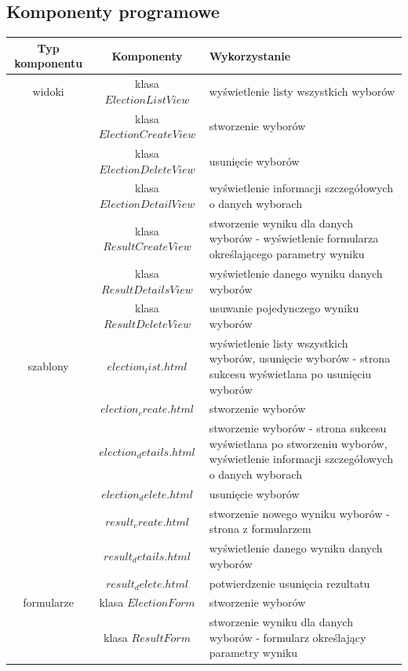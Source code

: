\documentclass[pdflatex,11pt]{../aghdoc_version2}
\begin{document}
\subsection{Komponenty programowe}
\begin{tabular}{|c|c|p{5cm}|}
\hline 
\textbf{Typ komponentu} & \textbf{Komponenty} & \textbf{Wykorzystanie} \\ 
\hline 
widoki & klasa $ElectionListView$ & wyświetlenie listy wszystkich wyborów \\ 
\cline{2-3} 
 & klasa $ElectionCreateView$ & stworzenie wyborów \\ 
\cline{2-3} 
 & klasa $ElectionDeleteView$ & usunięcie wyborów \\ 
\cline{2-3} 
 & klasa $ElectionDetailView$ & wyświetlenie informacji szczegółowych o
danych wyborach \\ 
\cline{2-3} 
 & klasa $ResultCreateView$ & stworzenie wyniku dla danych wyborów -
wyświetlenie formularza określającego
parametry wyniku \\ 
\cline{2-3} 
 & klasa $ResultDetailsView$ & wyświetlenie danego wyniku danych
wyborów \\ 
\cline{2-3} 
 & klasa $ResultDeleteView$ & usuwanie pojedynczego wyniku wyborów \\ 
\hline 
szablony & $election_list.html$ & wyświetlenie listy wszystkich wyborów,
usunięcie wyborów - strona sukcesu
wyświetlana po usunięciu wyborów \\ 
\cline{2-3} 
 & $election_create.html$ & stworzenie wyborów \\ 
\cline{2-3} 
 & $election_details.html$ & stworzenie wyborów - strona sukcesu
wyświetlana po stworzeniu wyborów,
wyświetlenie informacji szczegółowych o
danych wyborach \\ 
\cline{2-3} 
 & $election_delete.html$ & usunięcie wyborów \\ 
\cline{2-3} 
 & $result_create.html$ & stworzenie nowego wyniku wyborów -
strona z formularzem \\ 
\cline{2-3} 
 & $result_details.html$ & wyświetlenie danego wyniku danych
wyborów \\ 
\cline{2-3} 
 & $result_delete.html$ & potwierdzenie usunięcia rezultatu \\ 
\hline 
formularze & klasa $ElectionForm$ & stworzenie wyborów \\ 
\cline{2-3}
 & klasa $ResultForm$ & stworzenie wyniku dla danych wyborów -
formularz określający parametry wyniku \\
\hline 
\end{tabular} 
\end{document}
